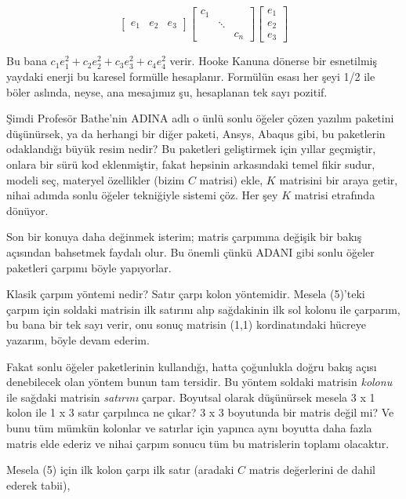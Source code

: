 \documentclass[12pt,fleqn]{article}\usepackage{../../common}
\begin{document}
$$
\left[\begin{array}{rrr}
e_1 & e_2 & e_3 
\end{array}\right]
\left[\begin{array}{rrr}
c_1 &        & \\
    & \ddots & \\
    &        & c_n
\end{array}\right]
\left[\begin{array}{r}
e_1 \\ e_2 \\ e_3
\end{array}\right]
$$

Bu bana $c_1 e_1^2 + c_2 e_2^2 + c_3 e_3^2 + c_4 e_4^2$ verir. Hooke Kanuna
dönerse bir esnetilmiş yaydaki enerji bu karesel formülle hesaplanır. Formülün
esası her şeyi 1/2 ile böler aslında, neyse, ana mesajımız şu, hesaplanan tek
sayı pozitif. 

Şimdi Profesör Bathe'nin ADINA adlı o ünlü sonlu öğeler çözen yazılım paketini
düşünürsek, ya da herhangi bir diğer paketi, Ansys, Abaqus gibi, bu paketlerin
odaklandığı büyük resim nedir? Bu paketleri geliştirmek için yıllar geçmiştir,
onlara bir sürü kod eklenmiştir, fakat hepsinin arkasındaki temel fikir sudur,
modeli seç, materyel özellikler (bizim $C$ matrisi) ekle, $K$ matrisini bir
araya getir, nihai adımda sonlu öğeler tekniğiyle sistemi çöz. Her şey $K$
matrisi etrafında dönüyor.

Son bir konuya daha değinmek isterim; matris çarpımına değişik bir bakış
açısından bahsetmek faydalı olur. Bu önemli çünkü ADANI gibi sonlu öğeler
paketleri çarpımı böyle yapıyorlar.

Klasik çarpım yöntemi nedir? Satır çarpı kolon yöntemidir. Mesela (5)'teki
çarpım için soldaki matrisin ilk satırını alıp sağdakinin ilk sol kolonu ile
çarparım, bu bana bir tek sayı verir, onu sonuç matrisin (1,1) kordinatındaki
hücreye yazarım, böyle devam ederim.

Fakat sonlu öğeler paketlerinin kullandığı, hatta çoğunlukla doğru bakış açısı
denebilecek olan yöntem bunun tam tersidir. Bu yöntem soldaki matrisin {\em kolonu}
ile sağdaki matrisin {\em satırını} çarpar. Boyutsal olarak düşünürsek mesela 3 x 1
kolon ile 1 x 3 satır çarpılınca ne çıkar? 3 x 3 boyutunda bir matris değil mi?
Ve bunu tüm mümkün kolonlar ve satırlar için yapınca aynı boyutta daha fazla
matris elde ederiz ve nihai çarpım sonucu tüm bu matrislerin toplamı olacaktır.

Mesela (5) için ilk kolon çarpı ilk satır (aradaki $C$ matris değerlerini de
dahil ederek tabii),
\end{document}
